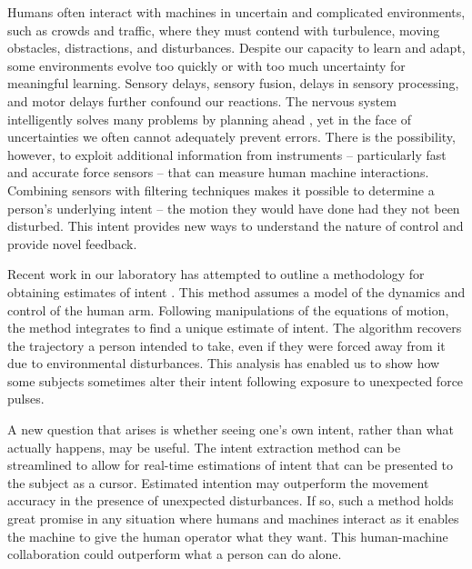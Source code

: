 \documentclass{frontiersSCNS} %
\begin{document}
Humans often interact with machines in uncertain and complicated environments, such as crowds and traffic, where they must contend with turbulence, moving obstacles, distractions, and disturbances. Despite our capacity to learn and adapt, some environments evolve too quickly or with too much uncertainty for meaningful learning. Sensory delays, sensory fusion, delays in sensory processing, and motor delays further confound our reactions. The nervous system intelligently solves many problems by planning ahead \citep{belen1967control}, yet in the face of uncertainties we often cannot adequately prevent errors. There is the possibility, however, to exploit additional information from instruments -- particularly fast and accurate force sensors -- that can measure human machine interactions. Combining sensors with filtering techniques makes it possible to determine a person’s underlying intent -- the motion they would have done had they not been disturbed. This intent provides new ways to understand the nature of control and provide novel feedback.

Recent work in our laboratory has attempted to outline a methodology for obtaining estimates of intent \citep{horowitz2015determining}. This method assumes a model of the dynamics and control of the human arm. Following manipulations of the equations of motion, the method integrates to find a unique estimate of intent. The algorithm recovers the trajectory a person intended to take, even if they were forced away from it due to environmental disturbances. This analysis has enabled us to show how some subjects sometimes alter their intent following exposure to unexpected force pulses.

A new question that arises is whether seeing one’s own intent, rather than what actually happens, may be useful. The intent extraction method can be streamlined to allow for real-time estimations of intent that can be presented to the subject as a cursor. Estimated intention may outperform the movement accuracy in the presence of unexpected disturbances. If so, such a method holds great promise in any situation where humans and machines interact as it enables the machine to give the human operator what they want. This human-machine collaboration could outperform what a person can do alone.
\end{document}
